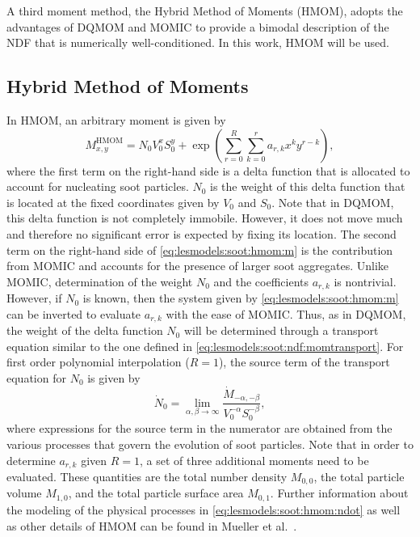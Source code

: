 A third moment method, the Hybrid Method of Moments (HMOM), adopts the advantages of DQMOM and MOMIC to provide a bimodal description of the NDF that is numerically well-conditioned. In this work, HMOM will be used.


\subsection{Hybrid Method of Moments}
\label{sec:lesmodels:soot:hmom}

In HMOM, an arbitrary moment is given by
\begin{equation}\label{eq:lesmodels:soot:hmom:m}
  M_{x,y}^{\text{HMOM}} = N_0 V_0^x S_0^y + \exp\left( \sum\limits_{r=0}^{R} \sum\limits_{k=0}^{r} a_{r,k}x^k y^{r-k} \right),
\end{equation}
where the first term on the right-hand side is a delta function that is allocated to account for nucleating soot particles. $N_0$ is the weight of this delta function that is located at the fixed coordinates given by $V_0$ and $S_0$. Note that in DQMOM, this delta function is not completely immobile. However, it does not move much and therefore no significant error is expected by fixing its location. The second term on the right-hand side of \cref{eq:lesmodels:soot:hmom:m} is the contribution from MOMIC and accounts for the presence of larger soot aggregates. Unlike MOMIC, determination of the weight $N_0$ and the coefficients $a_{r,k}$ is nontrivial. However, if $N_0$ is known, then the system given by \cref{eq:lesmodels:soot:hmom:m} can be inverted to evaluate $a_{r,k}$ with the ease of MOMIC. Thus, as in DQMOM, the weight of the delta function $N_0$ will be determined through a transport equation similar to the one defined in \cref{eq:lesmodels:soot:ndf:momtransport}. For first order polynomial interpolation ($R = 1$), the source term of the transport equation for $N_0$ is given by
\begin{equation}\label{eq:lesmodels:soot:hmom:ndot}
  \dot{N}_0 = \lim_{\alpha,\beta\to\infty} \frac{\dot{M}_{-\alpha,-\beta}}{V_0^{-\alpha} S_0^{-\beta}},
\end{equation}
where expressions for the source term in the numerator are obtained from the various processes that govern the evolution of soot particles. Note that in order to determine $a_{r,k}$ given $R = 1$, a set of three additional moments need to be evaluated. These quantities are the total number density $M_{0,0}$, the total particle volume $M_{1,0}$, and the total particle surface area $M_{0,1}$. Further information about the modeling of the physical processes in \cref{eq:lesmodels:soot:hmom:ndot} as well as other details of HMOM can be found in Mueller et al.~\cite{hmom2009,mueller2009,mueller2011}.
